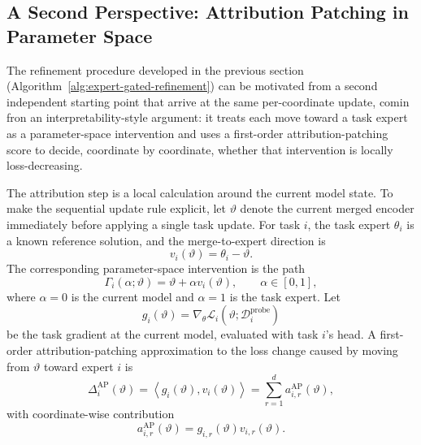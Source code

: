 \documentclass[11pt]{article}
\newcommand{\loss}{\mathcal{L}}
\newcommand{\data}{\mathcal{D}}
\begin{document}
\subsection{A Second Perspective: Attribution Patching in Parameter Space}
\label{sec:ap-view}
The refinement procedure developed in the previous section (Algorithm~\ref{alg:expert-gated-refinement}) can be motivated from a second independent starting point that arrive at the same per-coordinate update, comin fron an interpretability-style argument: it treats each move toward a task expert as a parameter-space intervention and uses a first-order attribution-patching score to decide, coordinate by coordinate, whether that intervention is locally loss-decreasing.


The attribution step is a local calculation around the current model state. To make the sequential update rule explicit, let $\vartheta$ denote the current merged encoder immediately before applying a single task update. For task $i$, the task expert $\theta_i$ is a known reference solution, and the merge-to-expert direction is
\begin{equation}
    v_i(\vartheta) = \theta_i - \vartheta .
    \label{eq:ap-expert-direction}
\end{equation}
The corresponding parameter-space intervention is the path
\begin{equation}
    \Gamma_i(\alpha;\vartheta)
    =
    \vartheta + \alpha v_i(\vartheta),
    \qquad \alpha \in [0,1],
    \label{eq:merge-to-expert-path}
\end{equation}
where $\alpha=0$ is the current model and $\alpha=1$ is the task expert. Let
\begin{equation}
    g_i(\vartheta) = \nabla_\theta \loss_i(\vartheta;\data_i^{\mathrm{probe}})
    \label{eq:ap-gradient}
\end{equation}
be the task gradient at the current model, evaluated with task $i$'s head. A first-order attribution-patching approximation to the loss change caused by moving from $\vartheta$ toward expert $i$ is
\begin{equation}
    \Delta_i^{\mathrm{AP}}(\vartheta)
    =
    \left\langle g_i(\vartheta), v_i(\vartheta) \right\rangle
    =
    \sum_{r=1}^{d} a_{i,r}^{\mathrm{AP}}(\vartheta),
    \label{eq:ap-total}
\end{equation}
with coordinate-wise contribution
\begin{equation}
    a_{i,r}^{\mathrm{AP}}(\vartheta)
    =
    g_{i,r}(\vartheta) v_{i,r}(\vartheta).
    \label{eq:ap-coordinate}
\end{equation}
\end{document}
